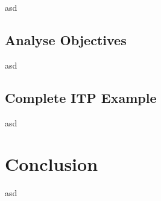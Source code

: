 \documentclass[
  oneside]{book}
\begin{document}
asd

\hypertarget{analyse-objectives}{%
\section{Analyse Objectives}\label{analyse-objectives}}

asd

\hypertarget{complete-itp-example}{%
\section{Complete ITP Example}\label{complete-itp-example}}

asd

\hypertarget{conclusion}{%
\chapter{Conclusion}\label{conclusion}}

asd

  
\end{document}
